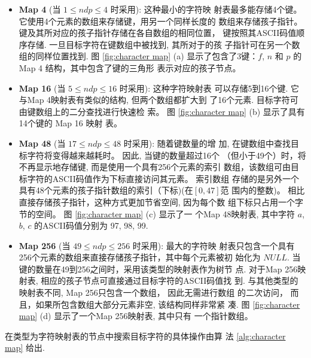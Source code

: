 \begin{itemize}
\item \textbf{Map 4} (当 $1 \leq ndp \leq 4$ 时采用): 这种最小的字符映
  射表最多能存储4个键。 它使用4个元素的数组来存储键，用另一个同样长度的
  数组来存储孩子指针。 键及其所对应的孩子指针存储在各自数组的相同位置，
  键按照其ASCII码值顺序存储. 一旦目标字符在键数组中被找到, 其所对于的孩
  子指针可在另一个数组的同样位置找到.  图 \ref{fig:character map} (a)
  显示了包含了3键：$f$, $n$ 和 $p$ 的 Map 4 结构，其中包含了键的三角形
  表示对应的孩子节点。

\item \textbf{Map 16} (当 $5 \leq ndp \leq 16$ 时采用): 这种字符映射表
  可以存储5到16个键. 它与Map 4映射表有类似的结构, 但两个数组都扩大到
  了16个元素. 目标字符可由键数组上的二分查找进行快速检
  索。 图 \ref{fig:character map} (b) 显示了具有14个键的 Map 16 映射
  表。


\item \textbf{Map 48} (当 $17 \leq ndp \leq 48$ 时采用): 随着键数量的增
  加, 在键数组中查找目标字符将变得越来越耗时。 因此, 当键的数量超过16个
  （但小于49个）时，将不再显示地存储键, 而是使用一个具有256个元素的索引
  数组，该数组可由目标字符的ASCII码值作为下标直接访问其元素。 索引数组
  存储的是另外一个具有48个元素的孩子指针数组的索引（下标)(在$[0,47]$范
  围内的整数)。 相比直接存储孩子指针，这种方式更加节省空间, 因为每个数
  组下标只占用一个字节的空间。 图 \ref{fig:character map} (c) 显示了一
  个Map 48映射表, 其中字符 $a$, $b$, $c$ 的ASCII码值分别为 97, 98, 99.

\item \textbf{Map 256} (当 $49 \leq ndp \leq 256$ 时采用): 最大的字符映
  射表只包含一个具有256个元素的数组来直接存储孩子指针，其中每个元素被初
  始化为 $NULL$. 当键的数量在49到256之间时，采用该类型的映射表作为树节
  点. 对于Map 256映射表, 相应的孩子节点可直接通过目标字符的ASCII码值找
  到. 与其他类型的映射表不同, Map 256只包含一个数组， 因此无需进行数组
  的二次访问， 而且，如果所包含数组大部分元素非空, 该结构同样非常紧
  凑. 图 \ref{fig:character map} (d) 显示了一个Map 256映射表, 其中只有
  一个指针数组。
\end{itemize}

在类型为字符映射表的节点中搜索目标字符的具体操作由算
法 \ref{alg:character map} 给出.

